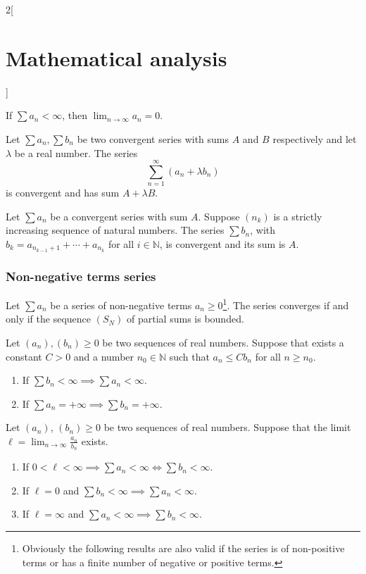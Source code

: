 \documentclass[class=article,crop=false]{standalone}
\begin{document}
\begin{multicols}{2}[\section{Mathematical analysis}]
\begin{corollary}
If $\sum a_n<\infty$, then $\displaystyle\lim_{n\to \infty} a_n=0$.
\end{corollary}
\begin{theorem}[Linearity]
Let $\sum a_n,\sum b_n$ be two convergent series with sums $A$ and $B$ respectively and let $\lambda$ be a real number. The series $$\sum_{n=1}^\infty (a_n+\lambda b_n)$$ is convergent and has sum $A+\lambda B$.
\end{theorem}
\begin{theorem}
Let $\sum a_n$ be a convergent series with sum $A$. Suppose $(n_k)$ is a strictly increasing sequence of natural numbers. The series $\sum b_n$, with $b_k=a_{n_{k-1}+1}+\cdots+a_{n_k}$ for all $i\in\mathbb{N}$, is convergent and its sum is $A$.
\end{theorem}
\subsubsection*{Non-negative terms series}
\begin{theorem}
Let $\sum a_n$ be a series of non-negative terms $a_n\geq 0$\footnote{Obviously the following results are also valid if the series is of non-positive terms or has a finite number of negative or positive terms.}. The series converges if and only if the sequence $(S_N)$ of partial sums is bounded.
\end{theorem}
\begin{theorem}
Let $(a_n),(b_n)\geq 0$ be two sequences of real numbers. Suppose that exists a constant $C>0$ and a number $n_0\in\mathbb{N}$ such that $a_n\leq Cb_n$ for all $n\geq n_0$.
\begin{enumerate}
    \item If $\sum b_n<\infty\implies\sum a_n<\infty$.
    \item If $\sum a_n=+\infty\implies\sum b_n=+\infty$.
\end{enumerate}
\end{theorem}
\begin{theorem}
Let $(a_n)$, $(b_n)\geq 0$ be two sequences of real numbers. Suppose that the limit $\ell=\displaystyle\lim_{n\to\infty}\frac{a_n}{b_n}$ exists.
\begin{enumerate}
    \item If $0<\ell<\infty\implies\sum a_n<\infty\iff\sum b_n<\infty$.
    \item If $\ell=0$ and $\sum b_n<\infty\implies\sum a_n<\infty$.
    \item If $\ell=\infty$ and $\sum a_n<\infty\implies\sum b_n<\infty$.

\end{enumerate}
\end{theorem}
\end{multicols}
\end{document}
